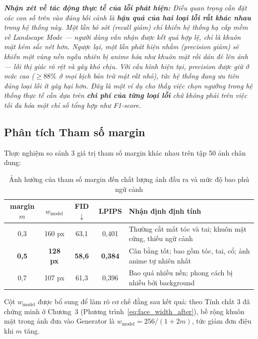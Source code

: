 \medskip
\noindent\textit{\textbf{Nhận xét về tác động thực tế của lỗi phát hiện:} Điều quan trọng cần đặt các con số trên vào đúng bối cảnh là \textbf{hậu quả của hai loại lỗi rất khác nhau} trong hệ thống này. Một lần bỏ sót (recall giảm) chỉ khiến hệ thống hạ cấp mềm về Landscape Mode --- người dùng vẫn nhận được kết quả hợp lệ, chỉ là khuôn mặt kém sắc nét hơn. Ngược lại, một lần phát hiện nhầm (precision giảm) sẽ khiến một vùng nền ngẫu nhiên bị anime hóa như khuôn mặt rồi dán đè lên ảnh --- lỗi thị giác rõ rệt và gây khó chịu. Với cấu hình hiện tại, precision được giữ ở mức cao ($\geq 88\%$ ở mọi kịch bản trừ mặt rất nhỏ), tức hệ thống đang ưu tiên đúng loại lỗi ít gây hại hơn. Đây là một ví dụ cho thấy việc chọn ngưỡng trong hệ thống thực tế cần dựa trên \textbf{chi phí của từng loại lỗi} chứ không phải trên việc tối đa hóa một chỉ số tổng hợp như F1-score.}

\subsection{Phân tích Tham số margin}
\label{subsec:margin_analysis}

Thực nghiệm so sánh 3 giá trị tham số margin khác nhau trên tập 50 ảnh chân dung:

\begin{table}[H]
\caption{Ảnh hưởng của tham số margin đến chất lượng ảnh đầu ra và mức độ bao phủ ngữ cảnh}
\label{tab:margin_eval}
\centering
\begin{tabular}{|c|c|c|c|p{5.5cm}|}
\hline
\textbf{margin $m$} & \textbf{$w_{\text{model}}$} & \textbf{FID $\downarrow$} & \textbf{LPIPS} & \textbf{Nhận định định tính} \\
\hline
0,3 & 160 px & 63,1 & 0,401 & Thường cắt mất tóc và tai; khuôn mặt cứng, thiếu ngữ cảnh \\
\hline
\textbf{0,5} & \textbf{128 px} & \textbf{58,6} & \textbf{0,384} & Cân bằng tốt; bao gồm tóc, tai, cổ; ảnh anime tự nhiên nhất \\
\hline
0,7 & 107 px & 61,3 & 0,396 & Bao quá nhiều nền; phong cách bị nhiễu bởi background \\
\hline
\end{tabular}
\end{table}

Cột $w_{\text{model}}$ được bổ sung để làm rõ cơ chế đằng sau kết quả: theo Tính chất 3 đã chứng minh ở Chương~3 (Phương trình~\ref{eq:face_width_after}), bề rộng khuôn mặt trong ảnh đưa vào Generator là $w_{\text{model}} = 256/(1+2m)$, tức giảm đơn điệu khi $m$ tăng.

